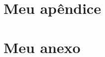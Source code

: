 

\frontmatter
\maketitlepage		%
\approval					%
\dedication				%
\acknowledgment		%
\printepigraph		%
\printabstract		%
\printengabstract	%
\printlof					%
\printlot					%
\printloa					%
\printtoc					%


\mainmatter







\backmatter
\printbibliography

\appendix
\chapter{Meu apêndice}


\attachment
\chapter{Meu anexo}





